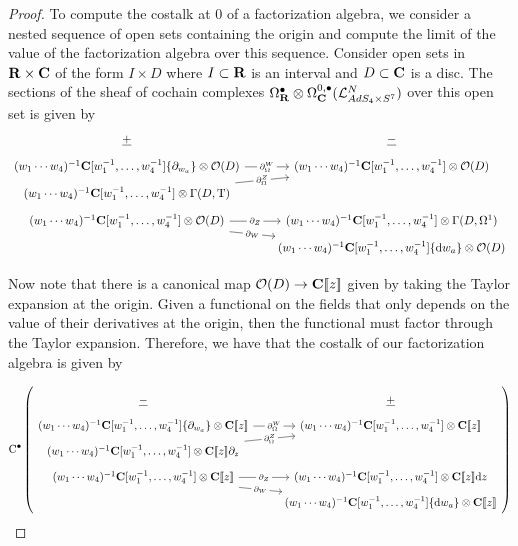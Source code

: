 \documentclass[../main.tex]{subfiles}
\begin{document}
\begin{proof}
To compute the costalk at $0$ of a factorization algebra, we consider a nested sequence of open sets containing the origin and compute the limit of the value of the factorization algebra over this sequence. Consider open sets in $\mathbf{R}\times \mathbf{C}$ of the form $I\times D$ where $I\subset \mathbf{R}$ is an interval and $D\subset \mathbf{C}$ is a disc. The sections of the sheaf of cochain complexes $\Omega^\bullet _{\mathbf{R}} \otimes \Omega^{0,\bullet}_{\mathbf{C}}(\mathcal{L}^N_{AdS_4\times S^7} ) $ over this open set is given by \begin{equation}
\begin{tikzcd}[row sep = 1 ex]
    \ul{+} & \ul{-} \\
(w_1\cdots w_4)^{-1} \C[w_1^{-1},\ldots, w_4^{-1}] \{\partial_{w_a}\} \otimes \mc{O}(D)\ar[r, "\del^W_\Omega" description] & (w_1\cdots w_4)^{-1} \C[w_1^{-1},\ldots, w_4^{-1}]  \otimes \mc O(D) \\
(w_1\cdots w_4)^{-1} \C[w_1^{-1},\ldots, w_4^{-1}]   \otimes \Gamma (D, \T)\ar[ur, "\del^Z_\Omega" description] \\
(w_1\cdots w_4)^{-1} \C[w_1^{-1},\ldots, w_4^{-1}] \otimes \mc{O}(D)\ar[r, "\del_Z" description]\ar[dr, "\del_W" description] & (w_1\cdots w_4)^{-1} \C[w_1^{-1},\ldots, w_4^{-1}] \otimes \Gamma (D, \Omega^1) \\ & (w_1\cdots w_4)^{-1} \C[w_1^{-1},\ldots, w_4^{-1}] \{\d w_a\}  \otimes \mc O(D)
\end{tikzcd}
\end{equation}

Now note that there is a canonical map $\mathcal{O}(D) \to \mathbf{C}[\![z]\!] $ given by taking the Taylor expansion at the origin. Given a functional on the fields that only depends on the value of their derivatives at the origin, then the functional must factor through the Taylor expansion. Therefore, we have that the costalk of our factorization algebra is given by 

\begin{equation}
 \clie^\bullet \left (\begin{tikzcd}[row sep = 1 ex]
        \ul{-} & \ul{+} \\ 
(w_1\cdots w_4)^{-1} \C[w_1^{-1},\ldots, w_4^{-1}] \{\partial_{w_a}\} \otimes \C[\![z]\!] \ar[r, "\del^W_\Omega" description] & (w_1\cdots w_4)^{-1} \C[w_1^{-1},\ldots, w_4^{-1}]  \otimes \C[\![z]\!] \\
(w_1\cdots w_4)^{-1} \C[w_1^{-1},\ldots, w_4^{-1}]   \otimes \C[\![z]\!]\del_z\ar[ur, "\del^Z_\Omega" description] \\
(w_1\cdots w_4)^{-1} \C[w_1^{-1},\ldots, w_4^{-1}] \otimes \C[\![z]\!]\ar[r, "\del_Z" description]\ar[dr, "\del_W" description] & (w_1\cdots w_4)^{-1} \C[w_1^{-1},\ldots, w_4^{-1}] \otimes \C[\![z]\!]\d z \\ & (w_1\cdots w_4)^{-1} \C[w_1^{-1},\ldots, w_4^{-1}] \{\d w_a\}  \otimes \C[\![z]\!]
\end{tikzcd} \right )
\end{equation}


\end{proof}
\end{document}
